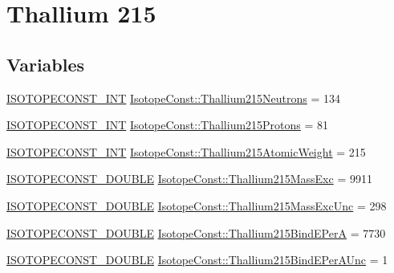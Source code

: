 \hypertarget{group___isotope_const-_thallium-_tl215}{}\section{Thallium 215}
\label{group___isotope_const-_thallium-_tl215}
\subsection*{Variables}
\begin{DoxyCompactItemize}
\item 
\mbox{\hyperlink{group___isotope_const-_macros_ga5f18360b3e99483a35c32d789e62621c}{I\+S\+O\+T\+O\+P\+E\+C\+O\+N\+S\+T\+\_\+\+I\+NT}} \mbox{\hyperlink{group___isotope_const-_thallium-_tl215_gacdec4c03e0c0541a6b7e3928c04238e9}{Isotope\+Const\+::\+Thallium215\+Neutrons}} = 134
\item 
\mbox{\hyperlink{group___isotope_const-_macros_ga5f18360b3e99483a35c32d789e62621c}{I\+S\+O\+T\+O\+P\+E\+C\+O\+N\+S\+T\+\_\+\+I\+NT}} \mbox{\hyperlink{group___isotope_const-_thallium-_tl215_gadf191ed9053cd04592731d7380e7a02c}{Isotope\+Const\+::\+Thallium215\+Protons}} = 81
\item 
\mbox{\hyperlink{group___isotope_const-_macros_ga5f18360b3e99483a35c32d789e62621c}{I\+S\+O\+T\+O\+P\+E\+C\+O\+N\+S\+T\+\_\+\+I\+NT}} \mbox{\hyperlink{group___isotope_const-_thallium-_tl215_ga8e900e4f2c39ce579bed7f440e2ae574}{Isotope\+Const\+::\+Thallium215\+Atomic\+Weight}} = 215
\item 
\mbox{\hyperlink{group___isotope_const-_macros_ga8f45a7272ce02c0b4c65c44636ed719a}{I\+S\+O\+T\+O\+P\+E\+C\+O\+N\+S\+T\+\_\+\+D\+O\+U\+B\+LE}} \mbox{\hyperlink{group___isotope_const-_thallium-_tl215_ga3028ffd997828236f8601bfa52dea279}{Isotope\+Const\+::\+Thallium215\+Mass\+Exc}} = 9911
\item 
\mbox{\hyperlink{group___isotope_const-_macros_ga8f45a7272ce02c0b4c65c44636ed719a}{I\+S\+O\+T\+O\+P\+E\+C\+O\+N\+S\+T\+\_\+\+D\+O\+U\+B\+LE}} \mbox{\hyperlink{group___isotope_const-_thallium-_tl215_ga58c94fe376da09ca1f505a4d8035a329}{Isotope\+Const\+::\+Thallium215\+Mass\+Exc\+Unc}} = 298
\item 
\mbox{\hyperlink{group___isotope_const-_macros_ga8f45a7272ce02c0b4c65c44636ed719a}{I\+S\+O\+T\+O\+P\+E\+C\+O\+N\+S\+T\+\_\+\+D\+O\+U\+B\+LE}} \mbox{\hyperlink{group___isotope_const-_thallium-_tl215_gab3ad2ea8fb314f18d88570aa97ce2ccf}{Isotope\+Const\+::\+Thallium215\+Bind\+E\+PerA}} = 7730
\item 
\mbox{\hyperlink{group___isotope_const-_macros_ga8f45a7272ce02c0b4c65c44636ed719a}{I\+S\+O\+T\+O\+P\+E\+C\+O\+N\+S\+T\+\_\+\+D\+O\+U\+B\+LE}} \mbox{\hyperlink{group___isotope_const-_thallium-_tl215_ga2dab42a7bbfe1b6b099fea0e554fc2da}{Isotope\+Const\+::\+Thallium215\+Bind\+E\+Per\+A\+Unc}} = 1

\end{DoxyCompactItemize}
